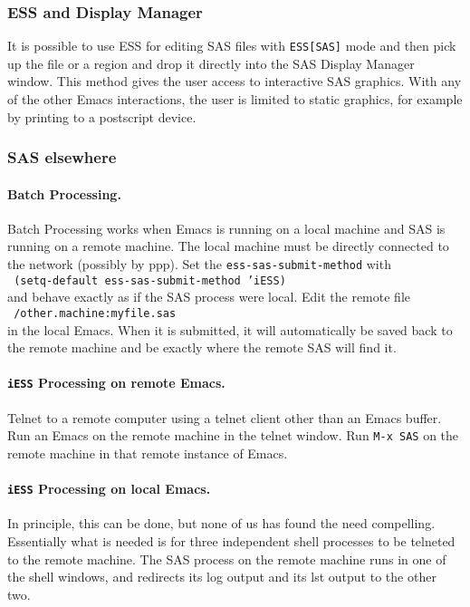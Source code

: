 \documentclass{article}
\newcommand{\stexttt}[1]{{\small\texttt{#1}}}
\newcommand{\ssf}[1]{{\small\sf{#1}}}
\newcommand{\elcode}[1]{\\{\stexttt{\hspace*{2em} #1}}\\}
\begin{document}
\subsubsection{ESS and Display Manager}
It is possible to use ESS for editing SAS files with \stexttt{ESS[SAS]} mode
and then pick up the file or a region and drop it directly into the SAS
Display Manager \ssf{Program Editor} window.
This method gives the user access to
interactive SAS graphics.  With any of the other Emacs interactions, the user
is limited to static graphics, for example by printing to a postscript device.

\subsubsection{SAS elsewhere}

\paragraph{Batch Processing.}
Batch Processing works when Emacs is running on a local machine and SAS
is running on a remote machine.  The local machine must be directly
connected to the network (possibly by ppp).
Set the \stexttt{ess-sas-submit-method} with
\elcode{(setq-default ess-sas-submit-method 'iESS)}
and behave exactly as if the SAS process were local.
Edit the remote file \elcode{/other.machine:myfile.sas} in the local Emacs.
When it is submitted, it will automatically be saved back to the remote
machine and be exactly where the remote SAS will find it.

\paragraph{\stexttt{iESS} Processing on remote Emacs.}
Telnet to a remote computer using a telnet client other than an Emacs buffer.
Run an Emacs on the remote machine in the telnet window.
Run \stexttt{M-x SAS} on the remote machine in that remote instance of Emacs.

\paragraph{\stexttt{iESS} Processing on local Emacs.}
In principle, this can be done, but none of us has found the need
compelling.  Essentially what is needed is for three independent shell
processes to be telneted to the remote machine.  The SAS process on
the remote machine runs in one of the shell windows, and redirects its
log output and its lst output to the other two.
\end{document}
